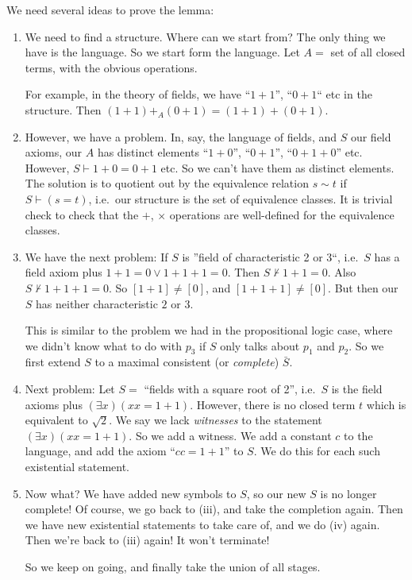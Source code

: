 \documentclass[a4paper]{article}
\begin{document}
We need several ideas to prove the lemma:
\begin{enumerate}
  \item We need to find a structure. Where can we start from? The only thing we have is the language. So we start form the language. Let $A =$ set of all closed terms, with the obvious operations.

    For example, in the theory of fields, we have ``$1 + 1$'', ``$0 + 1$`` etc in the structure. Then $(1 + 1) +_A (0 + 1) = (1 + 1) + (0 + 1)$.
  \item However, we have a problem. In, say, the language of fields, and $S$ our field axioms, our $A$ has distinct elements ``$1 + 0$'', ``$0 + 1$'', ``$0 + 1 + 0$'' etc. However, $S\vdash 1 + 0 = 0 + 1$ etc. So we can't have them as distinct elements. The solution is to quotient out by the equivalence relation $s\sim t$ if $S\vdash (s = t)$, i.e.\ our structure is the set of equivalence classes. It is trivial check to check that the $+$, $\times$ operations are well-defined for the equivalence classes.
  \item We have the next problem: If $S$ is ''field of characteristic 2 or 3``, i.e.\ $S$ has a field axiom plus $1 + 1 = 0 \vee 1 + 1 + 1 = 0$. Then $S\not\vdash 1 + 1 = 0$. Also $S\not\vdash 1 + 1 + 1 = 0$. So $[1 + 1] \not = [0]$, and $[1 + 1 + 1] \not= [0]$. But then our $S$ has neither characteristic $2$ or $3$.

    This is similar to the problem we had in the propositional logic case, where we didn't know what to do with $p_3$ if $S$ only talks about $p_1$ and $p_2$. So we first extend $S$ to a maximal consistent (or \emph{complete}) $\bar S$.

  \item Next problem: Let $S =$ ``fields with a square root of 2'', i.e.\ $S$ is the field axioms plus $(\exists x)(xx = 1 + 1)$. However, there is no closed term $t$ which is equivalent to $\sqrt{2}$. We say we lack \emph{witnesses} to the statement $(\exists x)(xx = 1 + 1)$. So we add a witness. We add a constant $c$ to the language, and add the axiom ``$cc = 1 + 1$'' to $S$. We do this for each such existential statement.

  \item Now what? We have added new symbols to $S$, so our new $S$ is no longer complete! Of course, we go back to (iii), and take the completion again. Then we have new existential statements to take care of, and we do (iv) again. Then we're back to (iii) again! It won't terminate!

      So we keep on going, and finally take the union of all stages.
  \end{enumerate}
\end{document}
